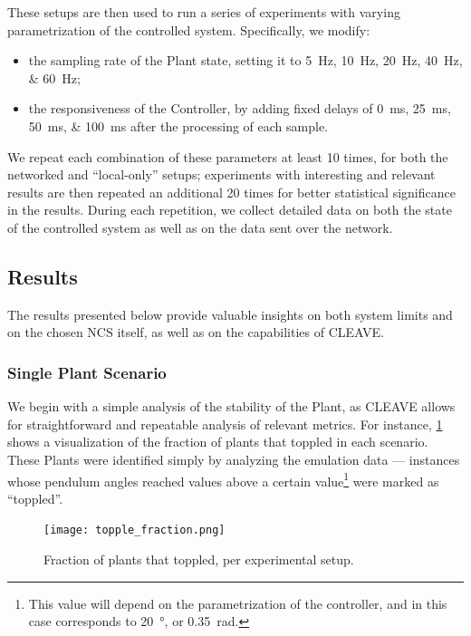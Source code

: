 These setups are then used to run a series of experiments with varying parametrization of the controlled system.
Specifically, we modify:
\begin{itemize}
    \item the sampling rate of the Plant state, setting it to \SIlist[list-units=single,list-final-separator={, or }]{5;10;20;40;60}{\hertz};
    \item the responsiveness of the Controller, by adding fixed delays of  \SIlist[list-units=single,list-final-separator={, or }]{0;25;50;100}{\milli\second} after the processing of each sample.
\end{itemize}
We repeat each combination of these parameters at least \num{10} times, for both the networked and ``local-only'' setups; experiments with interesting and relevant results are then repeated an additional \num{20} times for better statistical significance in the results.
During each repetition, we collect detailed data on both the state of the controlled system as well as on the data sent over the network.


\subsection{Results}\label{ssec:results}

The results presented below provide valuable insights on both system limits and on the chosen \ac{NCS} itself, as well as on the capabilities of \ac{CLEAVE}.

\subsubsection{Single Plant Scenario}

We begin with a simple analysis of the stability of the Plant, as \ac{CLEAVE} allows for straightforward and repeatable analysis of relevant metrics.  
For instance, \cref{fig:topple:fraction} shows a visualization of the fraction of plants that toppled in each scenario.
These Plants were identified simply by analyzing the emulation data --- instances whose pendulum angles reached values above a certain value\footnote{This value will depend on the parametrization of the controller, and in this case corresponds to \SI{20}{\degree}, or \SI{0.35}{\radian}.} were marked as ``toppled''.

\begin{figure}
    \centering
    \texttt{[image: topple\_fraction.png]}
    \caption{Fraction of plants that toppled, per experimental setup.}%
    \label{fig:topple:fraction}
\end{figure}

